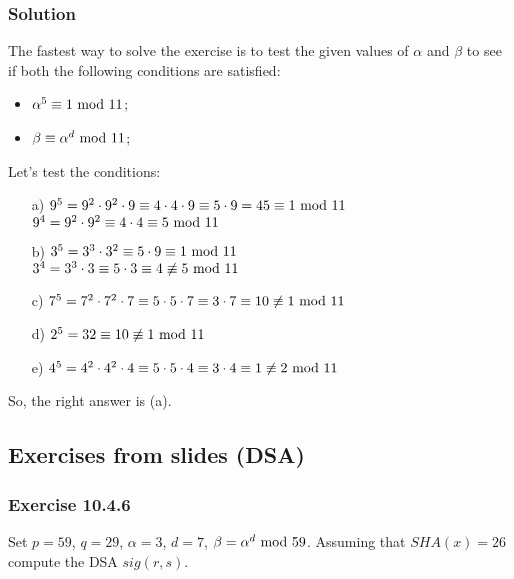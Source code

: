 \subsubsection*{Solution}
The fastest way to solve the exercise is to test the given values of $\alpha$ and $\beta$ to see if both the following conditions are satisfied:
\begin{itemize}
    \item $\alpha^5\equiv1\text{ mod }11$;
    \item $\beta\equiv\alpha^d\text{ mod }11$;
\end{itemize}
Let's test the conditions:
\begin{itemize}
    \item[a)] $9^5=9^2\cdot9^2\cdot9\equiv4\cdot4\cdot9\equiv5\cdot9=45\equiv1\text{ mod }11$ \textcolor{Green}{\checkmark}\\
    $9^4=9^2\cdot9^2\equiv4\cdot4\equiv5\text{ mod }11$ \textcolor{Green}{\checkmark}
    \item[b)] $3^5=3^3\cdot3^2\equiv5\cdot9\equiv1\text{ mod }11$ \checkmark\\
    $3^4=3^3\cdot3\equiv5\cdot3\equiv4\not\equiv5\text{ mod }11$
    \item[c)] $7^5=7^2\cdot7^2\cdot7\equiv5\cdot5\cdot7\equiv3\cdot7\equiv10\not\equiv1\text{ mod }11$
    \item[d)] $2^5=32\equiv10\not\equiv1\text{ mod }11$
    \item[e)] $4^5=4^2\cdot4^2\cdot4\equiv5\cdot5\cdot4\equiv3\cdot4\equiv1\not\equiv2\text{ mod }11$
\end{itemize}
So, the right answer is (a).

\newpage
\subsection{Exercises from slides (DSA)}
\subsubsection{Exercise 10.4.6}
Set $p=59$, $q=29$, $\alpha=3$, $d=7$, $\beta=\alpha^d\text{ mod }59$. Assuming that $SHA(x)=26$ compute the DSA $sig(r,s)$.

